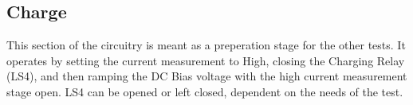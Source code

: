 \subsection{Charge}

This section of the circuitry is meant as a preperation stage for the other tests. 
It operates by setting the current measurement to High, closing the Charging Relay (LS4), and then ramping the DC Bias voltage with the high current measurement stage open. LS4 can be opened or left closed, dependent on the needs of the test.


